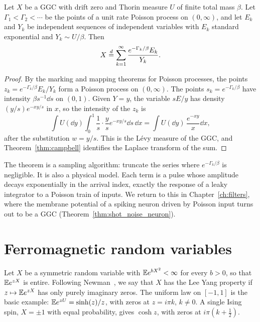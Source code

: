 \begin{theorem}
\label{thm:bondesson_shot}
Let $X$ be a GGC with drift zero and Thorin measure $U$ of finite total mass $\beta$. Let $\Gamma_1<\Gamma_2<\cdots$ be the points of a unit rate Poisson process on $(0,\infty)$, and let $E_k$ and $Y_k$ be independent sequences of independent variables with $E_k$ standard exponential and $Y_k\sim U/\beta$. Then
\[
X\stackrel{d}{=}\sum_{k=1}^\infty\frac{e^{-\Gamma_k/\beta}E_k}{Y_k}.
\]
\end{theorem}

\begin{proof}
By the marking and mapping theorems for Poisson processes, the points $z_k = e^{-\Gamma_k/\beta}E_k/Y_k$ form a Poisson process on $(0,\infty)$. The points $s_k = e^{-\Gamma_k/\beta}$ have intensity $\beta s^{-1}\dd s$ on $(0,1)$. Given $Y=y$, the variable $sE/y$ has density $(y/s)e^{-xy/s}$ in $x$, so the intensity of the $z_k$ is
\[
\int U(\dd y)\int_0^1\frac{1}{s}\cdot\frac{y}{s}e^{-xy/s}\dd s\,\dd x = \int U(\dd y)\,\frac{e^{-xy}}{x}\dd x,
\]
after the substitution $w = y/s$. This is the L\'evy measure of the GGC, and Theorem~\ref{thm:campbell} identifies the Laplace transform of the sum.
\end{proof}

The theorem is a sampling algorithm: truncate the series where $e^{-\Gamma_k/\beta}$ is negligible. It is also a physical model. Each term is a pulse whose amplitude decays exponentially in the arrival index, exactly the response of a leaky integrator to a Poisson train of inputs. We return to this in Chapter~\ref{ch:filters}, where the membrane potential of a spiking neuron driven by Poisson input turns out to be a GGC (Theorem~\ref{thm:shot_noise_neuron}).

\section{Ferromagnetic random variables}\label{sec:ferromagnetic}

Let $X$ be a symmetric random variable with $\mathbb{E} e^{bX^2}<\infty$ for every $b>0$, so that $\mathbb{E} e^{zX}$ is entire. Following Newman~\cite{newman1974}, we say that $X$ has the Lee Yang property if $z\mapsto\mathbb{E} e^{zX}$ has only purely imaginary zeros. The uniform law on $[-1,1]$ is the basic example: $\mathbb{E} e^{zU} = \sinh(z)/z$, with zeros at $z = i\pi k$, $k\neq0$. A single Ising spin, $X = \pm1$ with equal probability, gives $\cosh z$, with zeros at $i\pi(k+\frac12)$.

